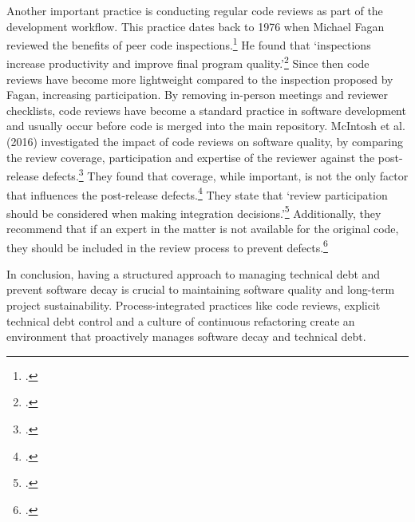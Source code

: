Another important practice is conducting regular code reviews as part of the development workflow. This practice dates back to 1976 when Michael Fagan reviewed the benefits of peer code inspections.\footcite[183]{faganDesignCodeInspections1976}
He found that `inspections increase productivity and improve final program quality.'\footcite[205]{faganDesignCodeInspections1976}
Since then code reviews have become more lightweight compared to the inspection proposed by Fagan, increasing participation. By removing in-person meetings and reviewer checklists, code reviews have become a standard practice in software development and usually occur before code is merged into the main repository.
McIntosh et al. (2016) investigated the impact of code reviews on software quality, by comparing the review coverage, participation and expertise of the reviewer against the post-release defects.\footcite[6]{mcintoshEmpiricalStudyImpact2016}
They found that coverage, while important, is not the only factor that influences the post-release defects.\footcite[39]{mcintoshEmpiricalStudyImpact2016}
They state that `review participation should be considered when making integration decisions.'\footcite[39]{mcintoshEmpiricalStudyImpact2016}
Additionally, they recommend that if an expert in the matter is not available for the original code, they should be included in the review process to prevent defects.\footcite[39]{mcintoshEmpiricalStudyImpact2016}

In conclusion, having a structured approach to managing technical debt and prevent software decay is crucial to maintaining software quality and long-term project sustainability.
Process-integrated practices like code reviews, explicit technical debt control and a culture of continuous refactoring create an environment that proactively manages software decay and technical debt.

